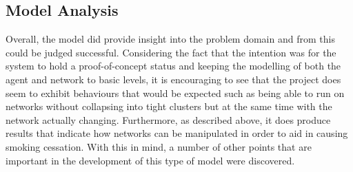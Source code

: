 \documentclass[]{report}
\begin{document}
\subsection{Model Analysis}
Overall, the model did provide insight into the problem domain and from this could be judged successful. Considering the fact that the intention was for the system to hold a proof-of-concept status and keeping the modelling of both the agent and network to basic levels, it is encouraging to see that the project does seem to exhibit behaviours that would be expected such as being able to run on networks without collapsing into tight clusters but at the same time with the network actually changing. Furthermore, as described above, it does produce results that indicate how networks can be manipulated in order to aid in causing smoking cessation. With this in mind, a number of other points that are important in the development of this type of model were discovered.
\end{document}
